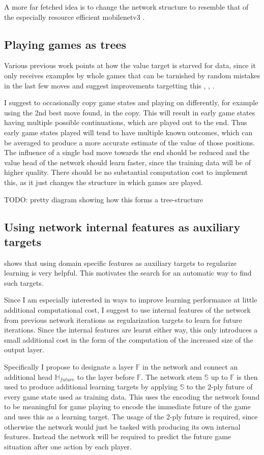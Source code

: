 \documentclass[12pt,onecolumn,oneside,titlepage]{article}
\begin{document}
A more far fetched idea is to change the network structure to resemble that of the especially resource efficient mobilenetv3 \cite{howard2019searching}. 

\subsection{Playing games as trees}

Various previous work points at how the value target is starved for data, since it only receives examples by whole games that can be tarnished by random mistakes in the last few moves and suggest improvements targetting this \cite{wu2019accelerating}, \cite{oracledevs6}, \cite{lan2019multiple}.

I suggest to occasionally copy game states and playing on differently, for example using the 2nd best move found, in the copy.
This will result in early game states having multiple possible continuations, which are played out to the end. Thus early game states played will tend to have multiple known outcomes,
which can be averaged to produce a more accurate estimate of the value of those positions. The influence of a single bad move towards the end should be reduced and the value head of the network should learn faster, since the training data will be of higher quality.
There should be no substantial computation cost to implement this, as it just changes the structure in which games are played.

TODO: pretty diagram showing how this forms a tree-structure

\subsection{Using network internal features as auxiliary targets}

\cite{wu2019accelerating} shows that using domain specific features as auxiliary targets to regularize learning is very helpful. This motivates the search for an automatic way to find such targets.

Since I am especially interested in ways to improve learning performance at little additional computational cost, I suggest to use internal features of the network from previous network iterations as regularization targets to learn for future iterations.
Since the internal features are learnt either way, this only introduces a small additional cost in the form of the computation of the increased size of the output layer.

Specifically I propose to designate a layer $\mathbb{F}$ in the network and connect an additional head $\mathbb{H}_{future}$ to the layer before $\mathbb{F}$. 
The network stem $\mathbb{S}$ up to $\mathbb{F}$ is then used to produce additional learning targets by applying $\mathbb{S}$ to the 2-ply future of every game state used as training data.
This uses the encoding the network found to be meaningful for game playing to encode the immediate future of the game and uses this as a learning target. The usage of the 2-ply future is required, since otherwise the network would just be tasked with producing
its own internal features. Instead the network will be required to predict the future game situation after one action by each player.
\end{document}
